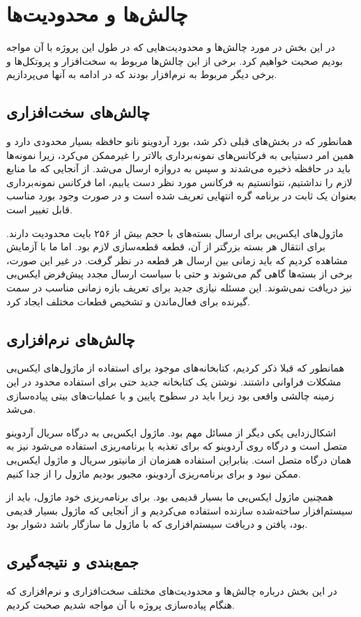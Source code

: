 \chapter{چالش‌ها و محدودیت‌ها}

در این بخش در مورد چالش‌ها و محدودیت‌هایی که در طول این پروژه با آن مواجه بودیم صحبت خواهیم کرد. برخی از این چالش‌ها مربوط به سخت‌افزار و پروتکل‌ها و برخی دیگر مربوط به نرم‌افزار بودند که در ادامه به آنها می‌پردازیم.

\section{چالش‌های سخت‌افزاری}

همانطور که در بخش‌های قبلی ذکر شد، بورد آردوینو نانو حافظه بسیار محدودی دارد و همین امر دستیابی به فرکانس‌های نمونه‌برداری بالاتر را غیرممکن می‌کرد، زیرا نمونه‌ها باید در حافظه ذخیره می‌شدند و سپس به دروازه ارسال می‌شد. از آنجایی که ما منابع لازم را نداشتیم، نتوانستیم به فرکانس مورد نظر دست یابیم، اما فرکانس نمونه‌برداری بعنوان یک ثابت در برنامه گره انتهایی تعریف شده است و در صورت وجود بورد مناسب قابل تغییر است.



ماژول‌های ایکس‌بی برای ارسال بسته‌های با حجم بیش از ۲۵۶ بایت محدودیت دارند. برای انتقال هر بسته بزرگتر از آن، قطعه قطعه‌سازی لازم بود. اما ما با آزمایش مشاهده کردیم که باید زمانی بین ارسال هر قطعه در نظر گرفت. در غیر این صورت، برخی از بسته‌ها گاهی گم می‌شوند و حتی با سیاست ارسال مجدد پیش‌فرض ایکس‌بی نیز دریافت نمی‌شوند. این مسئله نیازی جدید برای تعریف بازه زمانی مناسب در سمت گیرنده برای فعال‌ماندن و تشخیص قطعات مختلف ایجاد کرد.


\section{چالش‌های نرم‌افزاری}

همانطور که قبلا ذکر کردیم، کتابخانه‌های موجود برای استفاده از ماژول‌های ایکس‌بی مشکلات فراوانی داشتند. نوشتن یک کتابخانه جدید حتی برای استفاده محدود در این زمینه چالشی واقعی بود زیرا باید در سطوح پایین و با عملیات‌های بیتی پیاده‌سازی می‌شد.


اشکال‌زدایی یکی دیگر از مسائل مهم بود. ماژول ایکس‌بی به درگاه سریال آردوینو متصل است و درگاه  روی آردوینو که برای تغذیه یا برنامه‌ریزی استفاده می‌شود نیز به همان درگاه متصل است. بنابراین استفاده همزمان از مانیتور سریال و ماژول ایکس‌بی ممکن نبود و برای برنامه‌ریزی آردوینو، مجبور بودیم ماژول را از جدا کنیم.


همچنین ماژول ایکس‌بی ما بسیار قدیمی بود. برای برنامه‌ریزی خود ماژول، باید از سیستم‌افزار ساخته‌شده سازنده استفاده می‌کردیم و از آنجایی که ماژول بسیار قدیمی بود، یافتن و دریافت سیستم‌افزاری که با ماژول ما سازگار باشد دشوار بود.

\section{جمع‌بندی و نتیجه‌گیری}

در این بخش درباره چالش‌ها و محدودیت‌های مختلف سخت‌افزاری و نرم‌افزاری که هنگام پیاده‌سازی پروژه با آن مواجه شدیم صحبت کردیم.

